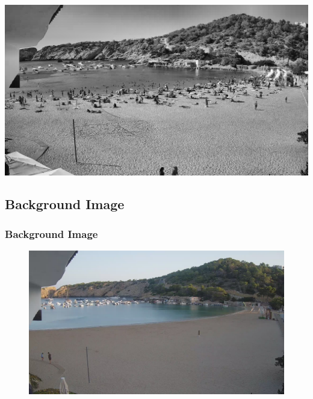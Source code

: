 \documentclass{beamer}
\begin{document}
\begin{frame}
    \centering
    \includegraphics[width=\textwidth]{../gen/equ/1660316400.jpg} 
\end{frame}

\subsection*{Background Image}
\begin{frame}
    \frametitle{Background Image}

    \begin{figure}
        \centering
        \includegraphics[width=\textwidth]{../Gelabert/1660284000.jpg}
    \end{figure}

\end{frame}
\end{document}
